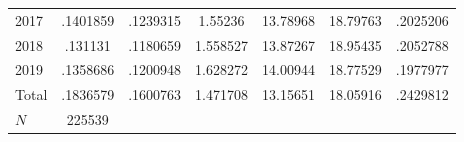 {\begin{longtable}{l*{1}{cccccc}}
2017        &    .1401859&    .1239315&     1.55236&    13.78968&    18.79763&    .2025206\\
2018        &     .131131&    .1180659&    1.558527&    13.87267&    18.95435&    .2052788\\
2019        &    .1358686&    .1200948&    1.628272&    14.00944&    18.77529&    .1977977\\
Total       &    .1836579&    .1600763&    1.471708&    13.15651&    18.05916&    .2429812\\
\hline
\(N\)       &      225539&            &            &            &            &            \\
\hline\hline
\end{longtable}
}
